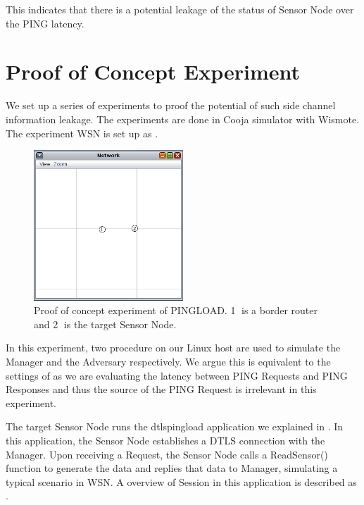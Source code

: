 This indicates that there is a potential leakage of the status of Sensor Node over the PING latency.

\section{Proof of Concept Experiment} \label{PoC PINGLOAD}

We set up a series of experiments to proof the potential of such side channel information leakage. The experiments are done in Cooja simulator with Wismote. The experiment WSN is set up as .

\begin{figure}
	\center
	\includegraphics[width=0.5\textwidth]{fig/PINGLOAD_PoC.png}
	\caption{Proof of concept experiment of PINGLOAD. \textcircled{1} is a border router and \textcircled{2} is the target Sensor Node.}
	\label{Fig: Proof of concept experiment of PINGLOAD}
\end{figure}

In this experiment, two procedure on our Linux host are used to simulate the Manager and the Adversary respectively. We argue this is equivalent to the settings of  as we are evaluating the latency between PING Requests and PING Responses and thus the source of the PING Request is irrelevant in this experiment.

The target Sensor Node runs the dtlspingload application we explained in . In this application, the Sensor Node establishes a DTLS connection with the Manager. Upon receiving a Request, the Sensor Node calls a ReadSensor() function to generate the data and replies that data to Manager, simulating a typical scenario in WSN. A overview of Session in this application is described as .

